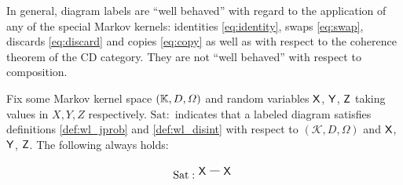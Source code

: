 \begin{lemma}

In general, diagram labels are ``well behaved'' with regard to the application of any of the special Markov kernels: identities \ref{eq:identity}, swaps \ref{eq:swap}, discards \ref{eq:discard} and copies \ref{eq:copy} as well as with respect to the coherence theorem of the CD category. They are not ``well behaved'' with respect to composition.

Fix some Markov kernel space $(\mathbb{K},D,\Omega)$ and random variables $\mathsf{X}$, $\mathsf{Y}$, $\mathsf{Z}$ taking values in $X,Y,Z$ respectively. $\mathrm{Sat:}$ indicates that a labeled diagram satisfies definitions \ref{def:wl_jprob} and \ref{def:wl_disint} with respect to $(\mathscr{K},D,\Omega)$ and $\mathsf{X}$, $\mathsf{Y}$, $\mathsf{Z}$.  The following always holds:

\begin{align}
\mathrm{Sat:}
\begin{tikzpicture}
\path (0,0) node (A) {$\RV{X}$}
++(0.8,0) node (X) {$\RV{X}$};
\draw (A) -- (X);
\end{tikzpicture}
\end{align}


\end{lemma}
